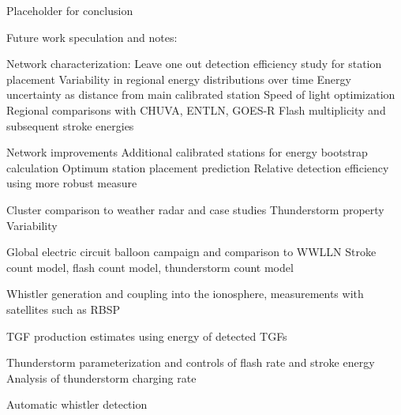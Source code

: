 Placeholder for conclusion

Future work speculation and notes:

Network characterization:
  Leave one out detection efficiency study for station placement
  Variability in regional energy distributions over time
  Energy uncertainty as distance from main calibrated station
  Speed of light optimization
  Regional comparisons with CHUVA, ENTLN, GOES-R
  Flash multiplicity and subsequent stroke energies

Network improvements
  Additional calibrated stations for energy bootstrap calculation
  Optimum station placement prediction
  Relative detection efficiency using more robust measure

Cluster comparison to weather radar and case studies
  Thunderstorm property Variability

Global electric circuit balloon campaign and comparison to WWLLN
  Stroke count model, flash count model, thunderstorm count model

Whistler generation and coupling into the ionosphere, measurements with satellites such as RBSP

TGF production estimates using energy of detected TGFs

Thunderstorm parameterization and controls of flash rate and stroke energy
  Analysis of thunderstorm charging rate

Automatic whistler detection


